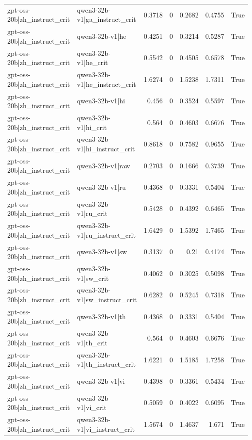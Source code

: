 \begin{table}
\begin{tabular}{l l r r r r l}
gpt-oss-20b|zh_instruct_crit & qwen3-32b-v1|ga_instruct_crit & 0.3718 & 0 & 0.2682 & 0.4755 & True \\
gpt-oss-20b|zh_instruct_crit & qwen3-32b-v1|he & 0.4251 & 0 & 0.3214 & 0.5287 & True \\
gpt-oss-20b|zh_instruct_crit & qwen3-32b-v1|he_crit & 0.5542 & 0 & 0.4505 & 0.6578 & True \\
gpt-oss-20b|zh_instruct_crit & qwen3-32b-v1|he_instruct_crit & 1.6274 & 0 & 1.5238 & 1.7311 & True \\
gpt-oss-20b|zh_instruct_crit & qwen3-32b-v1|hi & 0.456 & 0 & 0.3524 & 0.5597 & True \\
gpt-oss-20b|zh_instruct_crit & qwen3-32b-v1|hi_crit & 0.564 & 0 & 0.4603 & 0.6676 & True \\
gpt-oss-20b|zh_instruct_crit & qwen3-32b-v1|hi_instruct_crit & 0.8618 & 0 & 0.7582 & 0.9655 & True \\
gpt-oss-20b|zh_instruct_crit & qwen3-32b-v1|raw & 0.2703 & 0 & 0.1666 & 0.3739 & True \\
gpt-oss-20b|zh_instruct_crit & qwen3-32b-v1|ru & 0.4368 & 0 & 0.3331 & 0.5404 & True \\
gpt-oss-20b|zh_instruct_crit & qwen3-32b-v1|ru_crit & 0.5428 & 0 & 0.4392 & 0.6465 & True \\
gpt-oss-20b|zh_instruct_crit & qwen3-32b-v1|ru_instruct_crit & 1.6429 & 0 & 1.5392 & 1.7465 & True \\
gpt-oss-20b|zh_instruct_crit & qwen3-32b-v1|sw & 0.3137 & 0 & 0.21 & 0.4174 & True \\
gpt-oss-20b|zh_instruct_crit & qwen3-32b-v1|sw_crit & 0.4062 & 0 & 0.3025 & 0.5098 & True \\
gpt-oss-20b|zh_instruct_crit & qwen3-32b-v1|sw_instruct_crit & 0.6282 & 0 & 0.5245 & 0.7318 & True \\
gpt-oss-20b|zh_instruct_crit & qwen3-32b-v1|th & 0.4368 & 0 & 0.3331 & 0.5404 & True \\
gpt-oss-20b|zh_instruct_crit & qwen3-32b-v1|th_crit & 0.564 & 0 & 0.4603 & 0.6676 & True \\
gpt-oss-20b|zh_instruct_crit & qwen3-32b-v1|th_instruct_crit & 1.6221 & 0 & 1.5185 & 1.7258 & True \\
gpt-oss-20b|zh_instruct_crit & qwen3-32b-v1|vi & 0.4398 & 0 & 0.3361 & 0.5434 & True \\
gpt-oss-20b|zh_instruct_crit & qwen3-32b-v1|vi_crit & 0.5059 & 0 & 0.4022 & 0.6095 & True \\
gpt-oss-20b|zh_instruct_crit & qwen3-32b-v1|vi_instruct_crit & 1.5674 & 0 & 1.4637 & 1.671 & True \\

\end{tabular}
\end{table}
